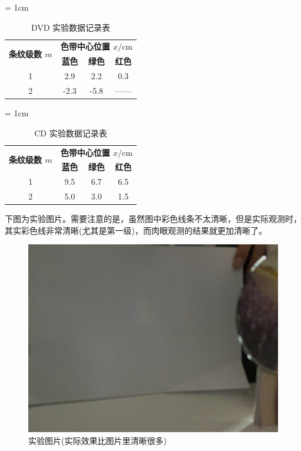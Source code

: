 \documentclass[fontset=windows]{article}
\begin{document}
\begin{table}[htbp]
    \centering
    \caption{DVD 实验数据记录表}
    \label{table1}
    \renewcommand\arraystretch{1.5}
    \tabcolsep = 1cm
    \begin{tabular}{|c|c|c|c|}
        \hline
        \multirow{2}{*}{\textbf{条纹级数 $m$}} & \multicolumn{3}{|c|}{\textbf{色带中心位置 $x/\mathrm{cm}$}}\\
        \cline{2-4} %
        & \textbf{蓝色} & \textbf{绿色} & \textbf{红色} \\
        \hline
        1 & 2.9 & 2.2 & 0.3 \\
        \hline
        2 & -2.3 & -5.8 & —— \\
        \hline
    \end{tabular}
\end{table}

\begin{table}[htbp]
    \centering
    \caption{CD 实验数据记录表}
    \label{table2}
    \renewcommand\arraystretch{1.5}
    \tabcolsep = 1cm
    \begin{tabular}{|c|c|c|c|}
        \hline
        \multirow{2}{*}{\textbf{条纹级数 $m$}} & \multicolumn{3}{|c|}{\textbf{色带中心位置 $x/\mathrm{cm}$}}\\
        \cline{2-4} %
        & \textbf{蓝色} & \textbf{绿色} & \textbf{红色} \\
        \hline
        1 & 9.5 & 6.7 & 6.5 \\
        \hline
        2 & 5.0 & 3.0 & 1.5 \\
        \hline
    \end{tabular}
\end{table}

下图为实验图片。需要注意的是，虽然图中彩色线条不太清晰，但是实际观测时，其实彩色线非常清晰(尤其是第一级)，而肉眼观测的结果就更加清晰了。

\begin{figure}[htbp]
	\centering
	\includegraphics[scale=0.07]{1.jpg}
	\caption{ 实验图片(实际效果比图片里清晰很多) }
	\label{6}
\end{figure}
\end{document}
